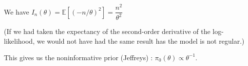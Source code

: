 \begin{itemize}
\begin{enumerate}
We have $I_n(\theta) = \mathbb{E}[(-n/\theta)^2] = \dfrac{n^2}{\theta^2}$\newline

(If we had taken the expectancy of the second-order derivative of the log-likelihood, we would not have had the same result has the model is not regular.)\newline

This gives us the noninformative prior (Jeffreys) : $\pi_0(\theta) \propto \theta^{-1}.$


\end{enumerate}



\end{itemize}


